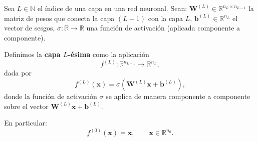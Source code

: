 \begin{definition}
\label{def:capa-densa}
    Sea $L \in \mathbb{N}$ el índice de una capa en una red neuronal.
    Sean:
    $\mathbf{W}^{(L)} \in \mathbb{R}^{n_L \times n_{L-1}}$ la matriz de pesos que conecta la capa $(L-1)$ con la capa $L$, $\mathbf{b}^{(L)} \in \mathbb{R}^{n_L}$ el vector de sesgos, $\sigma : \mathbb{R} \to \mathbb{R}$ una función de activación (aplicada componente a componente).

    Definimos la \textbf{capa $L$-ésima} como la aplicación
    \[
        f^{(L)} : \mathbb{R}^{n_{L-1}} \longrightarrow \mathbb{R}^{n_L},
    \]
    dada por
    \[
        f^{(L)}(\mathbf{x}) = \sigma\!\left(\mathbf{W}^{(L)} \mathbf{x} + \mathbf{b}^{(L)}\right),
    \]
    donde la función de activación $\sigma$ se aplica de manera componente a componente sobre el vector $\mathbf{W}^{(L)} \mathbf{x} + \mathbf{b}^{(L)}$.

    En particular:
    \[
        f^{(0)}(\mathbf{x}) = \mathbf{x}, \qquad \mathbf{x} \in \mathbb{R}^{n_0}.
    \]
\end{definition}

